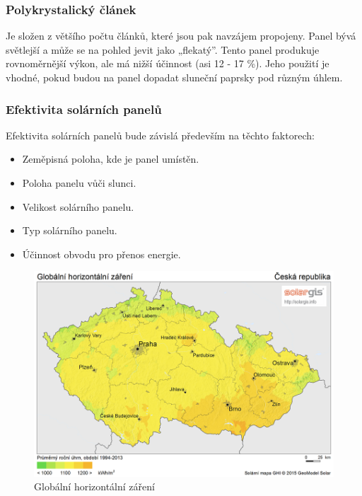 \subsubsection*{Polykrystalický článek}
Je složen z většího počtu článků, které jsou pak navzájem
propojeny. Panel bývá světlejší a může se na pohled jevit jako „flekatý”. Tento panel produkuje
rovnoměrnější výkon, ale má nižší účinnost (asi 12 - 17 \%). Jeho použití je vhodné, pokud budou na panel dopadat sluneční paprsky pod různým úhlem.

\subsubsection*{Efektivita solárních panelů}
Efektivita solárních panelů bude závislá především na těchto faktorech: 
\begin{itemize}
    \item Zeměpisná poloha, kde je panel umístěn.
    \item Poloha panelu vůči slunci.
    \item Velikost solárního panelu.
    \item Typ solárního panelu.
    \item Účinnost obvodu pro přenos energie. 
\end{itemize}

\begin{figure}[h]
  \begin{center}
    \includegraphics[scale=0.41]{obrazky/Solargis-CZ-GHI.png}
  \end{center}
  \caption{Globální horizontální záření \cite{solargis}}
\end{figure}

